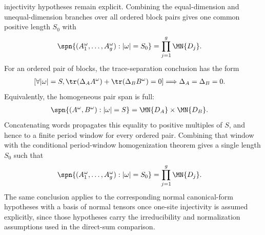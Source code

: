 \begin{lemma}
    injectivity hypotheses remain explicit. Combining the equal-dimension and
    unequal-dimension branches over all ordered block pairs gives one common
    positive length $S_0$ with
    \begin{align}
        \spn\{(A_1^\omega,\ldots,A_g^\omega):|\omega|=S_0\}
         & =
        \prod_{j=1}^g \MN{D_j}.
        \notag
    \end{align}
    For an ordered pair of blocks, the trace-separation conclusion has the form
    \begin{align}
        \left[\forall |\omega|=S,
            \tr(\Delta_A A^\omega)+\tr(\Delta_B B^\omega)=0\right]
         & \Longrightarrow
        \Delta_A=\Delta_B=0.
        \notag
    \end{align}
    Equivalently, the homogeneous pair span is full:
    \begin{align}
        \spn\{(A^\omega,B^\omega):|\omega|=S\}
         & =
        \MN{D_A}\times\MN{D_B}.
        \notag
    \end{align}
    Concatenating words propagates this equality to positive multiples of
    $S$, and hence to a finite period window for every ordered pair. Combining
    that window with the conditional period-window homogenization theorem gives
    a single length $S_0$ such that
    \begin{align}
        \spn\{(A_1^\omega,\ldots,A_g^\omega):|\omega|=S_0\}
         & =
        \prod_{j=1}^g \MN{D_j}.
        \notag
    \end{align}
    The same conclusion applies to the corresponding normal canonical-form
    hypotheses with a basis of normal tensors once one-site injectivity is
    assumed explicitly, since those hypotheses carry the irreducibility and
    normalization assumptions used in the direct-sum comparison.
\end{lemma}

